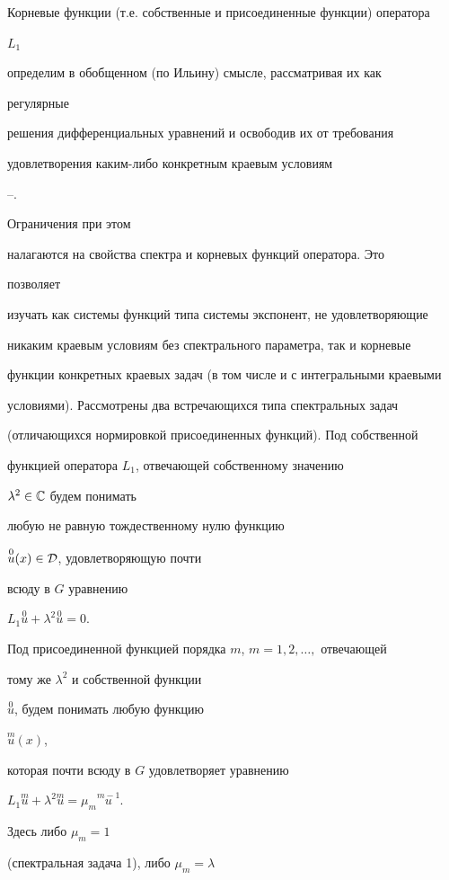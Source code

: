 Корневые функции (т.е. собственные и присоединенные функции) оператора


$L_1$


определим в обобщенном (по Ильину) смысле, рассматривая их как


регулярные


решения дифференциальных уравнений и освободив их от требования


удовлетворения каким-либо конкретным краевым условиям


\cite{1}--\cite{3}.


Ограничения при этом


налагаются на свойства спектра и корневых функций оператора. Это


позволяет


изучать как системы функций типа системы экспонент, не удовлетворяющие


никаким краевым условиям без спектрального параметра, так и корневые


функции конкретных краевых задач (в том числе и с интегральными краевыми


условиями). Рассмотрены два встречающихся типа спектральных задач


(отличающихся нормировкой присоединенных функций). Под собственной


функцией оператора $L_1$, отвечающей собственному значению


$\lambda^2\in\Bbb C$ будем понимать


любую не равную тождественному нулю функцию


$\overset{0}{u}{}(x)\in\cal D$, удовлетворяющую почти


всюду в $G$ уравнению


$L_1\overset{0}{u}{}+\lambda^2\overset{0}{u}{}=0$.


Под присоединенной функцией порядка $m$, $m=1,2,\dotsc,$ отвечающей


тому же $\lambda^2$ и собственной функции


$\overset{0}{u}{}$, будем понимать любую функцию


$\overset{m}{u}{}(x)$,


которая почти всюду в $G$ удовлетворяет уравнению


$L_1\overset{m}{u}{}+\lambda^2\overset{m}{u}{}=


\mu_m\overset{m-1}{u}{}$.


Здесь либо $\mu_m=1$


(спектральная задача 1), либо $\mu_m=\lambda$


